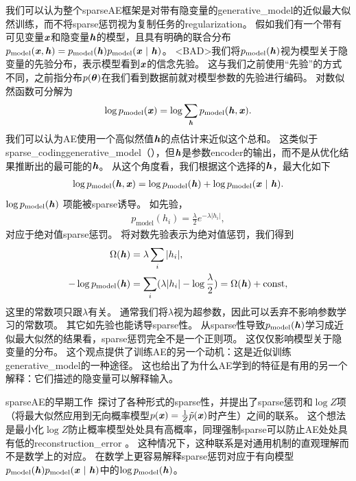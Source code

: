 
我们可以认为整个\gls{sparse}\gls{AE}框架是对带有隐变量的\gls{generative_model}的近似最大似然训练，而不将\gls{sparse}惩罚视为复制任务的\gls{regularization}。
假如我们有一个带有可见变量$\boldsymbol{\mathit{x}}$和隐变量$\boldsymbol{\mathit{h}}$的模型，且具有明确的联合分布$p_{\text{model}}(\boldsymbol{\mathit{x}},\boldsymbol{\mathit{h}})=p_{\text{model}}(\boldsymbol{\mathit{h}})p_{\text{model}} (\boldsymbol{\mathit{x}} ~|~ \boldsymbol{\mathit{h}})$。
<BAD>我们将$p_{\text{model}}(\boldsymbol{\mathit{h}})$视为模型关于隐变量的先验分布，表示模型看到$\boldsymbol{\mathit{x}}$的信念先验。
这与我们之前使用``先验''的方式不同，之前指分布$p(\boldsymbol{\theta})$在我们看到数据前就对模型参数的先验进行编码。
对数似然函数可分解为
\begin{align}
\log p_{\text{model}}(\boldsymbol{\mathit{x}})=\log \sum_{\boldsymbol{\mathit{h}}} p_{\text{model}}(\boldsymbol{\mathit{h}}, \boldsymbol{\mathit{x}}) .
\end{align}
我们可以认为\gls{AE}使用一个高似然值$\boldsymbol{\mathit{h}}$的点估计来近似这个总和。
这类似于\gls{sparse_coding}\gls{generative_model}（），但$\boldsymbol{\mathit{h}}$是参数\gls{encoder}的输出，而不是从优化结果推断出的最可能的$\boldsymbol{\mathit{h}}$。
从这个角度看，我们根据这个选择的$\boldsymbol{\mathit{h}}$，最大化如下
\begin{align}
\log p_{\text{model}}(\boldsymbol{\mathit{h}}, \boldsymbol{\mathit{x}})=\log p_{\text{model}}(\boldsymbol{\mathit{h}}) + \log p_{\text{model}}(\boldsymbol{\mathit{x}} ~|~ \boldsymbol{\mathit{h}}) .
\end{align}
$\log p_{\text{model}}(\boldsymbol{\mathit{h}}) $ 项能被\gls{sparse}诱导。
如先验，
\begin{align}
p_{\text{model}}(h_i) = \frac{\lambda}{2} e^{-\lambda | h_i |},
\end{align}
对应于绝对值\gls{sparse}惩罚。
将对数先验表示为绝对值惩罚，我们得到
\begin{align}
\Omega(\boldsymbol{\mathit{h}}) &= \lambda \sum_{i} | h_i  |,\\ 
-\log p_{\text{model}}(\boldsymbol{\mathit{h}}) &= 
\sum_i (\lambda | h_i | - \log \frac{\lambda}{2}) = \Omega(\boldsymbol{\mathit{h}}) + \text{const},
\end{align}
这里的常数项只跟$\lambda$有关。
通常我们将$\lambda$视为超参数，因此可以丢弃不影响参数学习的常数项。
其它如先验也能诱导\gls{sparse}性。
从\gls{sparse}性导致$p_{\text{model}}(\boldsymbol{\mathit{h}})$学习成近似最大似然的结果看，\gls{sparse}惩罚完全不是一个正则项。
这仅仅影响模型关于隐变量的分布。
这个观点提供了训练\gls{AE}的另一个动机：这是近似训练\gls{generative_model}的一种途径。
这也给出了为什么\gls{AE}学到的特征是有用的另一个解释：它们描述的隐变量可以解释输入。


\gls{sparse}\gls{AE}的早期工作~\citep{ranzato-07-small,ranzato-08-small}探讨了各种形式的\gls{sparse}性，并提出了\gls{sparse}惩罚和$\log  Z$项（将最大似然应用到无向概率模型$p(\boldsymbol{\mathit{x}})=\frac{1}{Z}\tilde{p}(\boldsymbol{\mathit{x}})$时产生）之间的联系。
这个想法是最小化$\log Z$防止概率模型处处具有高概率，同理强制\gls{sparse}可以防止\gls{AE}处处具有低的\gls{reconstruction_error} 。
这种情况下，这种联系是对通用机制的直观理解而不是数学上的对应。
在数学上更容易解释\gls{sparse}惩罚对应于有向模型$p_{\text{model}}(\boldsymbol{\mathit{h}})p_{\text{model}}(\boldsymbol{\mathit{x}} ~|~ \boldsymbol{\mathit{h}}) $中的$\log p_{\text{model}}(\boldsymbol{\mathit{h}})$。


